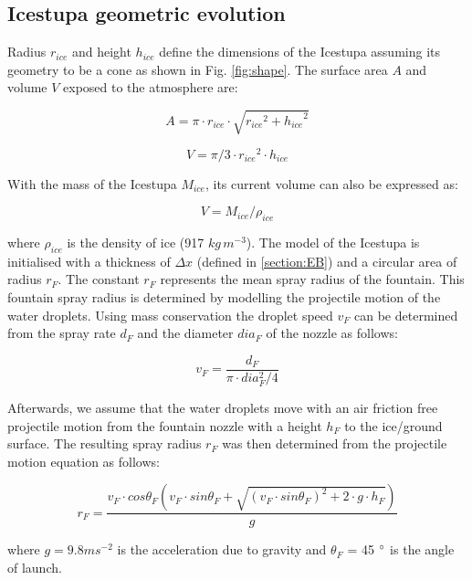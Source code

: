 \documentclass[utf8]{frontiersSCNS} %
\begin{document}
\subsection{Icestupa geometric evolution}

Radius $r_{ice}$ and height $h_{ice}$ define the dimensions of the Icestupa assuming its geometry to be a cone as
shown in Fig. \ref{fig:shape}. The surface area $A$ and volume $V$ exposed to the atmosphere are:

\begin{equation} A = \pi \cdot r_{ice} \cdot \sqrt{{r_{ice}}^2 + {h_{ice}}^ 2} \label{eqn:A} \end{equation}

\begin{equation} V = \pi/3 \cdot {r_{ice}}^2 \cdot h_{ice} \label{eqn:V} \end{equation}

With the mass of the Icestupa $M_{ice}$, its current volume can also be expressed as:

\begin{equation} V = M_{ice} / \rho_{ice} \label{eqn:V1} \end{equation}

where $\rho_{ice}$ is the density of ice (917 $kg\, m^{-3}$). The model of the Icestupa is initialised with a
thickness of $\Delta x$ (defined in \ref{section:EB}) and a circular area of radius $r_F$. The constant $r_F$
represents the mean spray radius of the fountain.  This fountain spray radius is determined by modelling the
projectile motion of the water droplets. Using mass conservation the droplet speed $v_F$ can be determined from the
spray rate $d_F$ and the diameter $dia_F$ of the nozzle as follows:

\begin{equation} v_F = \frac{d_F}{\pi \cdot dia_F^2/4} \end{equation}

Afterwards, we assume that the water droplets move with an air friction free projectile motion from the fountain
nozzle with a height $h_F$ to the ice/ground surface. The resulting spray radius $r_F$ was then determined from the
projectile motion equation as follows:

\begin{equation} r_F = \frac{v_F \cdot cos\theta_F (v_F \cdot sin\theta_F + \sqrt{(v_F \cdot sin\theta_F)^{2} + 2
\cdot g \cdot h_F})}{g} \end{equation}

where $g = 9.8 m s^{-2}$ is the acceleration due to gravity and $\theta_F$ = 45 $\degree$ is the angle of launch.
\end{document}
